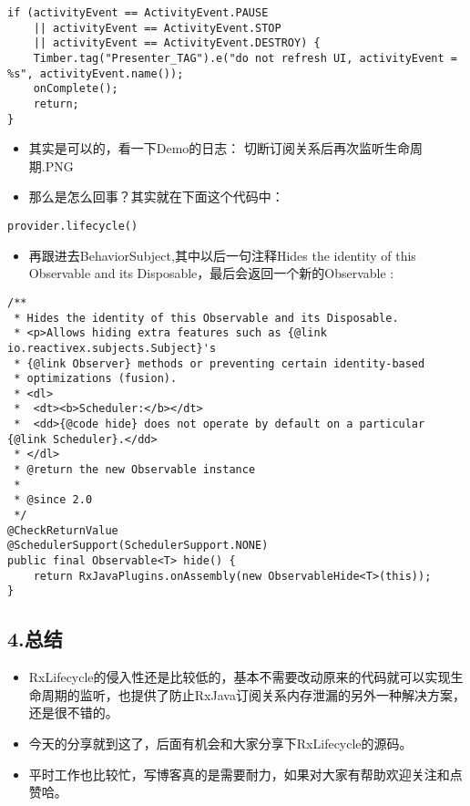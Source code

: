 \documentclass[9pt, b5paper]{article}
\begin{document}
\begin{verbatim}
if (activityEvent == ActivityEvent.PAUSE
    || activityEvent == ActivityEvent.STOP
    || activityEvent == ActivityEvent.DESTROY) {
    Timber.tag("Presenter_TAG").e("do not refresh UI, activityEvent = %s", activityEvent.name());
    onComplete();
    return;
}
\end{verbatim}
\begin{itemize}
\item 其实是可以的，看一下Demo的日志：  切断订阅关系后再次监听生命周期.PNG
\item 那么是怎么回事？其实就在下面这个代码中：
\end{itemize}
\begin{verbatim}
provider.lifecycle()
\end{verbatim}
\begin{itemize}
\item 再跟进去BehaviorSubject,其中以后一句注释Hides the identity of this Observable and its Disposable，最后会返回一个新的Observable :
\end{itemize}
\begin{verbatim}
/**
 * Hides the identity of this Observable and its Disposable.
 * <p>Allows hiding extra features such as {@link io.reactivex.subjects.Subject}'s
 * {@link Observer} methods or preventing certain identity-based
 * optimizations (fusion).
 * <dl>
 *  <dt><b>Scheduler:</b></dt>
 *  <dd>{@code hide} does not operate by default on a particular {@link Scheduler}.</dd>
 * </dl>
 * @return the new Observable instance
 *
 * @since 2.0
 */
@CheckReturnValue
@SchedulerSupport(SchedulerSupport.NONE)
public final Observable<T> hide() {
    return RxJavaPlugins.onAssembly(new ObservableHide<T>(this));
}
\end{verbatim}
\subsection{4.总结}
\label{sec-20-5}
\begin{itemize}
\item RxLifecycle的侵入性还是比较低的，基本不需要改动原来的代码就可以实现生命周期的监听，也提供了防止RxJava订阅关系内存泄漏的另外一种解决方案，还是很不错的。
\item 今天的分享就到这了，后面有机会和大家分享下RxLifecycle的源码。
\item 平时工作也比较忙，写博客真的是需要耐力，如果对大家有帮助欢迎关注和点赞哈。
\end{itemize}
\end{document}
